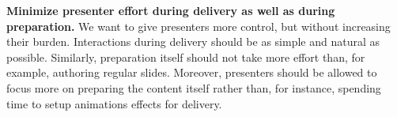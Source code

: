 \textbf{Minimize presenter effort during delivery as well as during preparation.} We want to give presenters more control, but without increasing their burden. Interactions during delivery should be as simple and natural as possible. Similarly, preparation itself should not take more effort than, for example, authoring regular slides. Moreover, presenters should be allowed to focus more on preparing the content itself rather than, for instance, spending time to setup animations effects for delivery. 



